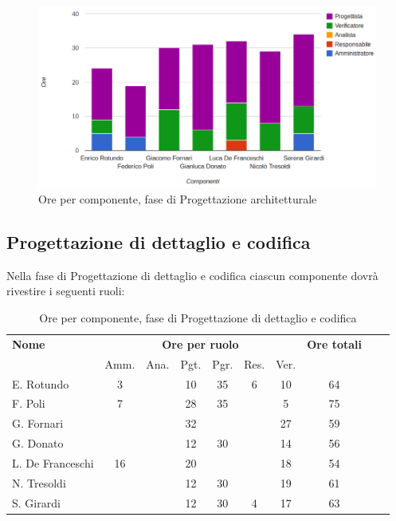 \begin{figure}[H]
\centering
\includegraphics[scale=0.35]{4-2.png}
\caption{Ore per componente, fase di Progettazione architetturale\label{fig:nome}}
\end{figure}

\pagebreak
\subsection{Progettazione di dettaglio e codifica}

Nella fase di Progettazione di dettaglio e codifica ciascun componente dovrà rivestire i seguenti ruoli:

\begin{table}[H]
\centering
\begin{tabular}{lccccccccc}
\toprule 
    \textbf{Nome}  & \multicolumn{6}{c}{\textbf{Ore per ruolo}} & \textbf{Ore totali}\\
     & Amm. & Ana. & Pgt. & Pgr. & Res. & Ver. \\
    \midrule
    E. Rotundo   	& 3 &  &	 10	& 35 & 6 & 10 &	64 \\
    F. Poli  		& 7	&  &	 28	& 35 &   & 5  & 75 \\
    G. Fornari		& 	&  &	 32	&    &   & 27 & 59 \\
    G. Donato 		& 	&  &	 12	& 30 &   & 14 & 56 \\
    L. De Franceschi 	& 16	&  &	 20	&    &   & 18 & 54 \\
    N. Tresoldi 		& 	&  &	 12	& 30 &   & 19 & 61 \\
   	S. Girardi 		& 	&  &	 12	& 30 & 4 & 17 & 63 \\
    
    \bottomrule
\end{tabular}
\caption{Ore per componente, fase di Progettazione di dettaglio e codifica}
\end{table}

